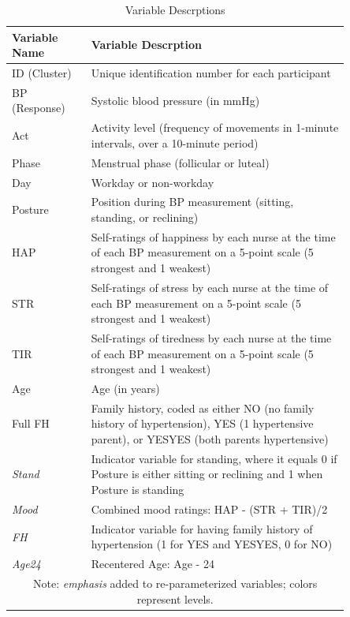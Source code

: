 \documentclass[12pt,twoside,leqno,fleqn,letterpaper]{article}
\theoremstyle{definition}
\theoremstyle{definition}
\begin{document}
\begin{table}[H]
    \centering\begin{tabular}{|p{0.2\linewidth} | p{0.65\linewidth}|}
        \hline
        Variable Name & Variable Descrption \\
        \hline\hline
        ID (Cluster) & Unique identification number for each participant \\
        \hline
        BP (Response) & Systolic blood pressure (in mmHg) \\
        \hline
        \textcolor[RGB]{208, 2, 27}{Act} & Activity level (frequency of movements in 1-minute intervals, over a 10-minute period) \\
        \hline
        \textcolor[RGB]{74, 144, 226}{Phase} & Menstrual phase (follicular or luteal) \\
        \hline
        \textcolor[RGB]{74, 144, 226}{Day} & Workday or non-workday \\
        \hline
        \textcolor[RGB]{208, 2, 27}{Posture} & Position during BP measurement (sitting, standing, or reclining) \\
        \hline
        \textcolor[RGB]{208, 2, 27}{HAP} & Self-ratings of happiness by each nurse at the time of each BP measurement on a 5-point scale (5 strongest and 1 weakest) \\
        \hline
        \textcolor[RGB]{208, 2, 27}{STR} & Self-ratings of stress by each nurse at the time of each BP measurement on a 5-point scale (5 strongest and 1 weakest) \\
        \hline
        \textcolor[RGB]{208, 2, 27}{TIR} & Self-ratings of tiredness by each nurse at the time of each BP measurement on a 5-point scale (5 strongest and 1 weakest) \\
        \hline
        \textcolor[RGB]{74, 144, 226}{Age} & Age (in years) \\
        \hline
        \textcolor[RGB]{74, 144, 226}{Full FH} & Family history, coded as either NO (no family history of  hypertension), YES (1 hypertensive parent), or YESYES (both parents hypertensive) \\
        \hline\hline
        \emph{\textcolor[RGB]{208, 2, 27}{Stand}} & Indicator variable for standing, where it equals 0 if Posture is either sitting or reclining and 1 when Posture is standing \\
        \hline
        \emph{\textcolor[RGB]{208, 2, 27}{Mood}} & Combined mood ratings: HAP - (STR + TIR)/2 \\
        \hline
        \emph{\textcolor[RGB]{74, 144, 226}{FH}} & Indicator variable for having family history of hypertension (1 for YES and YESYES, 0 for NO) \\
        \hline
        \emph{\textcolor[RGB]{74, 144, 226}{Age24}} & Recentered Age: Age - 24 \\
        \hline
        \multicolumn{2}{c}{\footnotesize Note: \emph{emphasis} added to re-parameterized variables; colors represent levels.}
    \end{tabular}
    \caption{Variable Descrptions}
    \label{tab: var desc}
\end{table}
\end{document}
